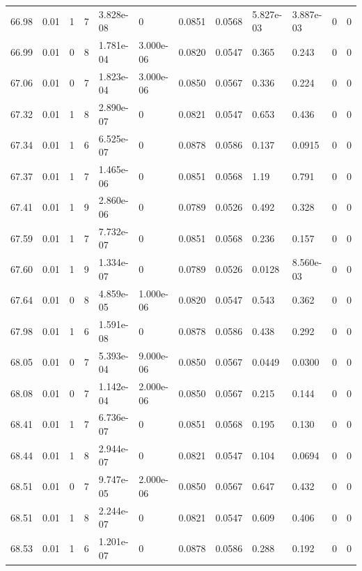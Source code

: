 \documentclass[preview]{standalone}
\begin{document}
{{{{{{{{{{{{{{{{{{\begin{tabular}{L{1.2cm}C{1.2cm} C{0.3cm}C{0.5cm} C{1.4cm}C{1.4cm} C{1.4cm}C{1.4cm} C{1.6cm}C{1.6cm} C{1.6cm}C{1.6cm}}
  66.98  &  0.01  & 1     &  7 &  3.828e-08  & 0  &  0.0851&   0.0568& 5.827e-03 & 3.887e-03   &  0 & 0  \\ 
  66.99  &  0.01  & 0     &  8 &  1.781e-04  & 3.000e-06  &  0.0820&   0.0547& 0.365 & 0.243   &  0 & 0  \\ 
  67.06  &  0.01  & 0     &  7 &  1.823e-04  & 3.000e-06  &  0.0850&   0.0567& 0.336 & 0.224   &  0 & 0  \\ 
  67.32  &  0.01  & 1     &  8 &  2.890e-07  & 0  &  0.0821&   0.0547& 0.653 & 0.436   &  0 & 0  \\ 
  67.34  &  0.01  & 1     &  6 &  6.525e-07  & 0  &  0.0878&   0.0586& 0.137 & 0.0915   &  0 & 0  \\ 
  67.37  &  0.01  & 1     &  7 &  1.465e-06  & 0  &  0.0851&   0.0568& 1.19 & 0.791   &  0 & 0  \\ 
  67.41  &  0.01  & 1     &  9 &  2.860e-06  & 0  &  0.0789&   0.0526& 0.492 & 0.328   &  0 & 0  \\ 
  67.59  &  0.01  & 1     &  7 &  7.732e-07  & 0  &  0.0851&   0.0568& 0.236 & 0.157   &  0 & 0  \\ 
  67.60  &  0.01  & 1     &  9 &  1.334e-07  & 0  &  0.0789&   0.0526& 0.0128 & 8.560e-03   &  0 & 0  \\ 
  67.64  &  0.01  & 0     &  8 &  4.859e-05  & 1.000e-06  &  0.0820&   0.0547& 0.543 & 0.362   &  0 & 0  \\ 
  67.98  &  0.01  & 1     &  6 &  1.591e-08  & 0  &  0.0878&   0.0586& 0.438 & 0.292   &  0 & 0  \\ 
  68.05  &  0.01  & 0     &  7 &  5.393e-04  & 9.000e-06  &  0.0850&   0.0567& 0.0449 & 0.0300   &  0 & 0  \\ 
  68.08  &  0.01  & 0     &  7 &  1.142e-04  & 2.000e-06  &  0.0850&   0.0567& 0.215 & 0.144   &  0 & 0  \\ 
  68.41  &  0.01  & 1     &  7 &  6.736e-07  & 0  &  0.0851&   0.0568& 0.195 & 0.130   &  0 & 0  \\ 
  68.44  &  0.01  & 1     &  8 &  2.944e-07  & 0  &  0.0821&   0.0547& 0.104 & 0.0694   &  0 & 0  \\ 
  68.51  &  0.01  & 0     &  7 &  9.747e-05  & 2.000e-06  &  0.0850&   0.0567& 0.647 & 0.432   &  0 & 0  \\ 
  68.51  &  0.01  & 1     &  8 &  2.244e-07  & 0  &  0.0821&   0.0547& 0.609 & 0.406   &  0 & 0  \\ 
  68.53  &  0.01  & 1     &  6 &  1.201e-07  & 0  &  0.0878&   0.0586& 0.288 & 0.192   &  0 & 0  \\ 

\end{tabular}}}}}}}}}}}}}}}}}}}
\end{document}
